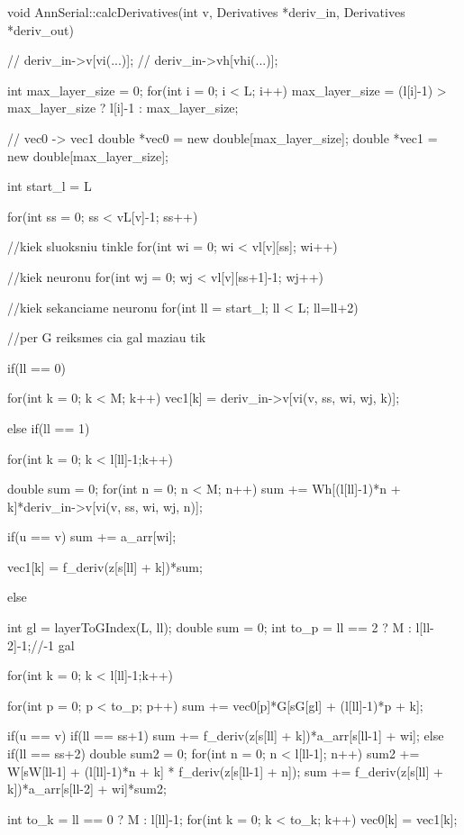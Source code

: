 void AnnSerial::calcDerivatives(int v, Derivatives *deriv_in, Derivatives *deriv_out){
  // deriv_in->v[vi(...)];
  // deriv_in->vh[vhi(...)];

  int max_layer_size = 0;
  for(int i = 0; i < L; i++)
    max_layer_size = (l[i]-1) > max_layer_size ? l[i]-1 : max_layer_size;

  // vec0 -> vec1
  double *vec0 = new double[max_layer_size];
  double *vec1 = new double[max_layer_size];


  int start_l = L%

    for(int ss = 0; ss < vL[v]-1; ss++){//kiek sluoksniu tinkle
      for(int wi = 0; wi < vl[v][ss]; wi++){//kiek neuronu
        for(int wj = 0; wj < vl[v][ss+1]-1; wj++){//kiek sekanciame neuronu
          for(int ll = start_l; ll < L; ll=ll+2){//per G reiksmes  cia gal maziau tik

            if(ll == 0){

              for(int k = 0; k < M; k++)
                vec1[k] = deriv_in->v[vi(v, ss, wi, wj, k)];

            }else if(ll == 1){

              for(int k = 0; k < l[ll]-1;k++){
                double sum = 0;
                for(int n = 0; n < M; n++){
                  sum += Wh[(l[ll]-1)*n + k]*deriv_in->v[vi(v, ss, wi, wj, n)];
                }

                if(u == v) sum += a_arr[wi];

                vec1[k] = f_deriv(z[s[ll] + k])*sum;
              }


            }else {


              int gl = layerToGIndex(L, ll);
              double sum = 0;
              int to_p = ll == 2 ? M : l[ll-2]-1;//-1 gal


              for(int k = 0; k < l[ll]-1;k++){
                for(int p = 0; p < to_p; p++){
                  sum += vec0[p]*G[sG[gl] + (l[ll]-1)*p + k];
                }


                if(u == v){
                  if(ll == ss+1)
                    sum += f_deriv(z[s[ll] + k])*a_arr[s[ll-1] + wi];
                  else if(ll == ss+2){
                      double sum2 = 0;
                      for(int n = 0; n < l[ll-1]; n++)
                       sum2 += W[sW[ll-1] + (l[ll]-1)*n + k] * f_deriv(z[s[ll-1] + n]);
                      sum += f_deriv(z[s[ll] + k])*a_arr[s[ll-2] + wi]*sum2;
                  }
                }
              }
            }
            int to_k = ll == 0 ? M : l[ll]-1;
            for(int k = 0; k < to_k; k++) vec0[k] = vec1[k];

}}}}}

